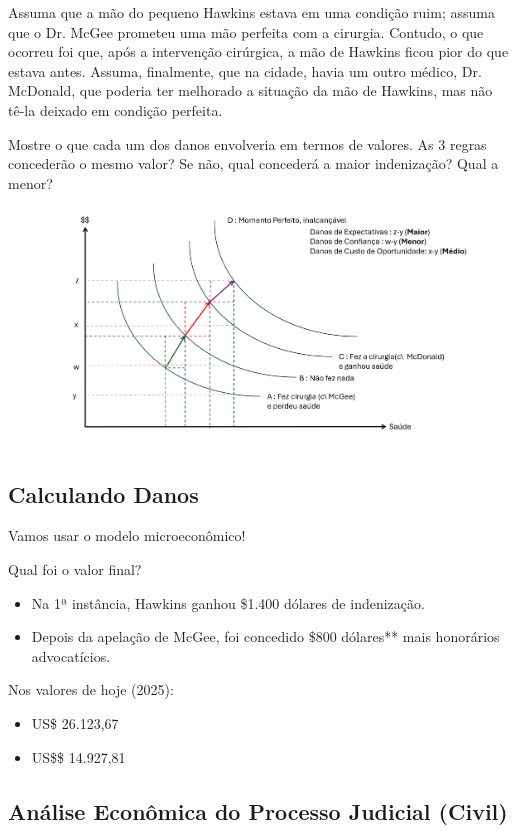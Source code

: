 \documentclass[a4paper,12pt]{article}[abntex2]
\begin{document}
Assuma que a mão do pequeno Hawkins  estava em uma condição ruim; assuma que o Dr. McGee prometeu uma mão perfeita com a cirurgia. Contudo, o que ocorreu foi que, após a intervenção cirúrgica, a mão de Hawkins ficou pior do que estava antes. Assuma, finalmente, que na cidade, havia um outro médico, Dr. McDonald, que poderia ter melhorado a situação da mão de Hawkins, mas não tê-la deixado em condição perfeita. 

Mostre o que cada um dos danos envolveria em termos de valores. As 3 regras concederão o mesmo valor? Se não, qual concederá a maior indenização? Qual a menor?

\begin{figure}[H]
    \centering
    \includegraphics[width=0.7\linewidth]{Imagens/a12i4.png}
\end{figure}

\subsection{\textbf{Calculando Danos}}
Vamos usar o modelo microeconômico!

Qual foi o valor final?\begin{itemize}
    \item Na 1ª instância, Hawkins ganhou \$1.400 dólares de indenização. 
    \item Depois da apelação de McGee, foi concedido \$800 dólares** mais honorários advocatícios. 
\end{itemize}

Nos valores de hoje (2025):\begin{itemize}
    \item US\$ 26.123,67
    \item US\$\$ 14.927,81
\end{itemize}

\subsection{\textbf{Análise Econômica do Processo Judicial (Civil)}}
\end{document}
